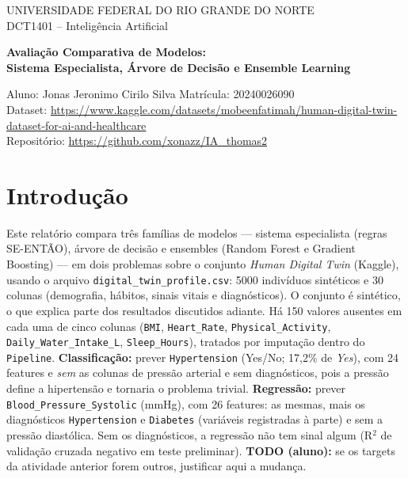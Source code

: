 \documentclass[11pt,a4paper]{article}
\begin{document}
\begin{titlepage}\centering
{\large UNIVERSIDADE FEDERAL DO RIO GRANDE DO NORTE\\DCT1401 -- Inteligência Artificial\\}\vspace{2cm}
{\LARGE\bfseries Avaliação Comparativa de Modelos:\\Sistema Especialista, Árvore de Decisão e Ensemble Learning\par}
\vspace{2cm}Aluno: Jonas Jeronimo Cirilo Silva \quad Matrícula: 20240026090\\[1ex]
Dataset: \url{https://www.kaggle.com/datasets/mobeenfatimah/human-digital-twin-dataset-for-ai-and-healthcare}\\[1ex]
Repositório: \url{https://github.com/xonazz/IA\_thomas2}
\end{titlepage}

\section{Introdução}
Este relatório compara três famílias de modelos --- sistema especialista (regras SE-ENTÃO), árvore de decisão e ensembles
(Random Forest e Gradient Boosting) --- em dois problemas sobre o conjunto \emph{Human Digital Twin} (Kaggle), usando o arquivo
\texttt{digital\_twin\_profile.csv}: 5000 indivíduos sintéticos e 30 colunas (demografia, hábitos, sinais vitais e diagnósticos).
O conjunto é sintético, o que explica parte dos resultados discutidos adiante. Há 150 valores ausentes em cada uma de cinco colunas
(\texttt{BMI}, \texttt{Heart\_Rate}, \texttt{Physical\_Activity}, \texttt{Daily\_Water\_Intake\_L}, \texttt{Sleep\_Hours}), tratados por imputação dentro do \texttt{Pipeline}.
\textbf{Classificação:} prever \texttt{Hypertension} (Yes/No; 17,2\% de \emph{Yes}), com 24 features e \emph{sem} as colunas de pressão arterial
e sem diagnósticos, pois a pressão define a hipertensão e tornaria o problema trivial.
\textbf{Regressão:} prever \texttt{Blood\_Pressure\_Systolic} (mmHg), com 26 features: as mesmas, mais os diagnósticos
\texttt{Hypertension} e \texttt{Diabetes} (variáveis registradas à parte) e sem a pressão diastólica. Sem os diagnósticos, a regressão não tem
sinal algum (R$^2$ de validação cruzada negativo em teste preliminar). \textbf{TODO (aluno):} se os targets da atividade anterior forem outros, justificar aqui a mudança.
\end{document}
